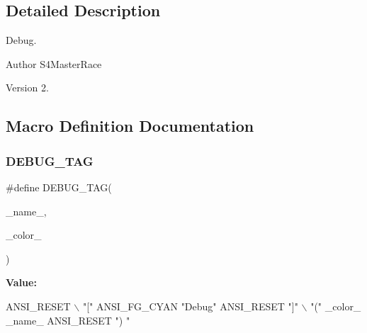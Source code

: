 \subsection{Detailed Description}
Debug. 

\begin{DoxyAuthor}{Author}
S4\+Master\+Race 
\end{DoxyAuthor}
\begin{DoxyVersion}{Version}
2. 
\end{DoxyVersion}


\subsection{Macro Definition Documentation}
\mbox{\label{debug_8h_a78999266903dfc706993a8a91aba6991}} 
\subsubsection{D\+E\+B\+U\+G\+\_\+\+T\+AG}
{\footnotesize\ttfamily \#define D\+E\+B\+U\+G\+\_\+\+T\+AG(\begin{DoxyParamCaption}\item[{}]{\+\_\+name\+\_\+,  }\item[{}]{\+\_\+color\+\_\+ }\end{DoxyParamCaption})}

{\bfseries Value\+:}
\begin{DoxyCode}
ANSI_RESET \(\backslash\)
  \textcolor{stringliteral}{"["} ANSI_FG_CYAN \textcolor{stringliteral}{"Debug"} ANSI_RESET \textcolor{stringliteral}{"]"} \(\backslash\)
  \textcolor{stringliteral}{"("} \_color\_ \_name\_ ANSI_RESET \textcolor{stringliteral}{") "}
\end{DoxyCode}
